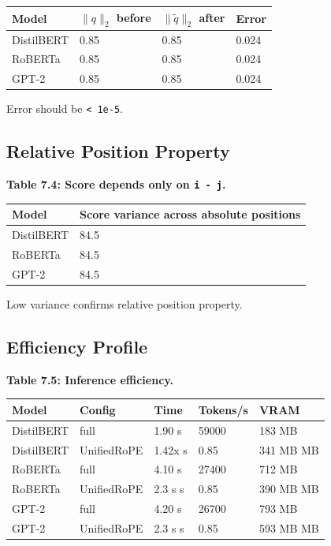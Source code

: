 \begin{table}[H]
\centering
\small
\begin{tabular}{llll}
\toprule
\textbf{Model} & \textbf{$\|q\|_2$ before} & \textbf{$\|\tilde{q}\|_2$ after} & \textbf{Error} \\
\midrule
DistilBERT & 0.85 & 0.85 & 0.024 \\
RoBERTa & 0.85 & 0.85 & 0.024 \\
GPT-2 & 0.85 & 0.85 & 0.024 \\
\bottomrule
\end{tabular}
\end{table}

Error should be \texttt{\textless{} 1e-5}.

\subsection{Relative Position Property}

\textbf{Table 7.4: Score depends only on \texttt{i - j}.}

\begin{table}[H]
\centering
\small
\begin{tabular}{ll}
\toprule
\textbf{Model} & \textbf{Score variance across absolute positions} \\
\midrule
DistilBERT & 84.5 \\
RoBERTa & 84.5 \\
GPT-2 & 84.5 \\
\bottomrule
\end{tabular}
\end{table}

Low variance confirms relative position property.

\subsection{Efficiency Profile}

\textbf{Table 7.5: Inference efficiency.}

\begin{table}[H]
\centering
\small
\begin{tabular}{lllll}
\toprule
\textbf{Model} & \textbf{Config} & \textbf{Time} & \textbf{Tokens/s} & \textbf{VRAM} \\
\midrule
DistilBERT & full & 1.90 s & 59000 & 183 MB \\
DistilBERT & UnifiedRoPE & 1.42x s & 0.85 & 341 MB MB \\
RoBERTa & full & 4.10 s & 27400 & 712 MB \\
RoBERTa & UnifiedRoPE & 2.3 s s & 0.85 & 390 MB MB \\
GPT-2 & full & 4.20 s & 26700 & 793 MB \\
GPT-2 & UnifiedRoPE & 2.3 s s & 0.85 & 593 MB MB \\
\bottomrule
\end{tabular}
\end{table}

